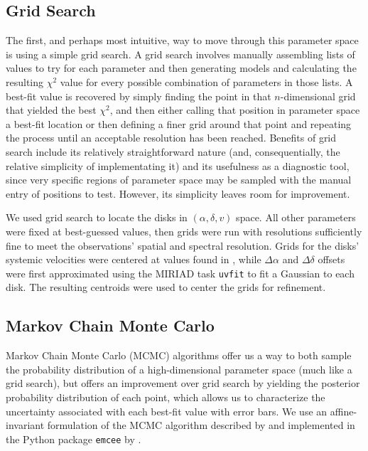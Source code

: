 \subsection{Grid Search}
\label{subsection:grid_search}
The first, and perhaps most intuitive, way to move through this parameter space is using a simple grid search. A grid search involves manually assembling lists of values to try for each parameter and then generating models and calculating the resulting $\chi^2$ value for every possible combination of parameters in those lists. A best-fit value is recovered by simply finding the point in that $n$-dimensional grid that yielded the best $\chi^2$, and then either calling that position in parameter space a best-fit location or then defining a finer grid around that point and repeating the process until an acceptable resolution has been reached. Benefits of grid search include its relatively straightforward nature (and, consequentially, the relative simplicity of implementating it) and its usefulness as a diagnostic tool, since very specific regions of parameter space may be sampled with the manual entry of positions to test. However, its simplicity leaves room for improvement.

We used grid search to locate the disks in $(\alpha, \delta, v)$ space. All other parameters were fixed at best-guessed values, then grids were run with resolutions sufficiently fine to meet the observations' spatial and spectral resolution. Grids for the disks' systemic velocities were centered at values found in \citet{Williams2014}, while $\Delta \alpha$ and $\Delta \delta$ offsets were first approximated using the MIRIAD task \texttt{uvfit} to fit a Gaussian to each disk. The resulting centroids were used to center the grids for refinement.


\subsection{Markov Chain Monte Carlo}
\label{subsection:mcmc}

Markov Chain Monte Carlo (MCMC) algorithms offer us a way to both sample the probability distribution of a high-dimensional parameter space (much like a grid search), but offers an improvement over grid search by yielding the posterior probability distribution of each point, which allows us to characterize the uncertainty associated with each best-fit value with error bars. We use an affine-invariant formulation of the MCMC algorithm described by \citet{Goodman2010} and implemented in the Python package \texttt{emcee} by \citet{ForemanMackey2013}.

